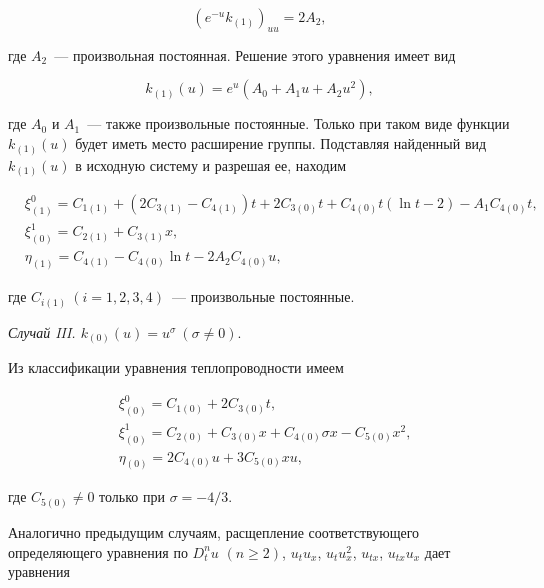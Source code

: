$$

(e^{-u}k_{(1)})_{uu} = 2 A_2,

$$

где $A_2$~--- произвольная постоянная. Решение этого уравнения имеет вид 

$$

k_{(1)}(u)=e^{u} \left(A_0+A_1 u + A_2 u^2 \right), 

$$

где $A_0$ и $A_1$~--- также произвольные постоянные. Только при таком виде функции $k_{(1)}(u)$ будет иметь место расширение группы. Подставляя найденный вид $k_{(1)}(u)$ в исходную систему и разрешая ее, находим

\begin{align*}

& \xi^0_{(1)} = C_{1(1)}+(2C_{3(1)}-C_{4(1)})t+2C_{3(0)}t+C_{4(0)}t (\ln t-2)-A_1 C_{4(0)}t, \\

& \xi^1_{(0)} = C_{2(1)}+C_{3(1)}x, \\

& \eta_{(1)} = C_{4(1)}-C_{4(0)} \ln t -2 A_2 C_{4(0)} u,

\end{align*}

где $C_{i(1)} \ (i=1,2,3,4)$~--- произвольные постоянные.



\vspace{2mm}

\textit{Случай III. $k_{(0)}(u)=u^{\sigma} \ (\sigma \neq 0).$}



Из классификации \cite{LSU:Ovs} уравнения теплопроводности имеем

\begin{align*}

& \xi^0_{(0)} = C_{1(0)}+2C_{3(0)}t, \nonumber \\

& \xi^1_{(0)} = C_{2(0)}+C_{3(0)}x+C_{4(0)} \sigma x-C_{5(0)}x^2, \label{LSU:X0_us}\\

& \eta_{(0)} = 2C_{4(0)} u + 3C_{5(0)} xu, \nonumber

\end{align*}

где $C_{5(0)} \neq 0$ только при $\sigma=-4/3$.



Аналогично предыдущим случаям, расщепление соответствующего определяющего уравнения по $D^{n}_t u$ $(n \ge 2)$, $u_t u_x$, $u_t u_x^2$, $u_{tx}$, $u_{tx} u_x$ дает уравнения

